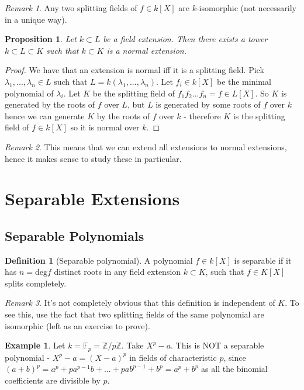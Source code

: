 \documentclass{article}
\theoremstyle{definition}
\newtheorem{defn}{Definition}[section]
\newtheorem{exmp}{Example}[section]
\theoremstyle{plain}%
\newtheorem{prop}[thm]{Proposition}
\theoremstyle{remark}
\newtheorem*{rem}{Remark}
\newcommand{\Z}{\mathbb{Z}}
\begin{document}
\begin{rem}
    Any two splitting fields of $f \in k[X]$ are $k$-isomorphic (not necessarily in a unique way).
\end{rem}

\begin{prop}
    Let $k \subset L$ be a field extension. Then there exists a tower $k \subset L \subset K$ such that $k \subset K$ is a normal extension.
\end{prop}

\begin{proof}
    We have that an extension is normal iff it is a splitting field. Pick $\lambda_1, ..., \lambda_n \in L$ such that $L=k(\lambda_1, ..., \lambda_n)$. Let $f_i \in k[X]$ be the minimal polynomial of $\lambda_i$. Let $K$ be the splitting field of $f_1f_2...f_n = f \in L[X]$. So $K$ is generated by the roots of $f$ over $L$, but $L$ is generated by some roots of $f$ over $k$ hence we can generate $K$ by the roots of $f$ over $k$ - therefore $K$ is the splitting field of $f \in k[X]$ so it is normal over $k$.
\end{proof}

\begin{rem}
    This means that we can extend all extensions to normal extensions, hence it makes sense to study these in particular.
\end{rem}

\section{Separable Extensions}

\subsection{Separable Polynomials}

\begin{defn}[Separable polynomial]
    A polynomial $f \in k[X]$ is separable if it has $n=\text{deg}f$ distinct roots in any field extension $k \subset K$, such that $f \in K[X]$ splits completely.
\end{defn}

\begin{rem}
    It's not completely obvious that this definition is independent of $K$. To see this, use the fact that two splitting fields of the same polynomial are isomorphic (left as an exercise to prove).
\end{rem}

\begin{exmp}
    Let $k = \mathbb{F}_p = \Z/p\Z$. Take $X^p - a$. This is NOT a separable polynomial - $X^p - a = (X-a)^p$ in fields of characteristic $p$, since $(a + b)^p = a^p + pa^{p-1}b + ... + pab^{p-1} + b^p = a^p + b^p$ as all the binomial coefficients are divisible by $p$.
\end{exmp}
\end{document}
